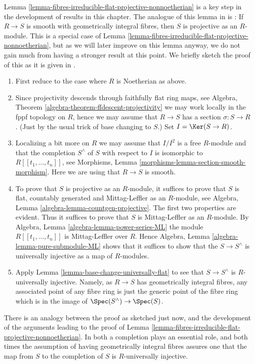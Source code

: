\begin{remark}
\label{remark-how-in-RG}
Lemma \ref{lemma-fibres-irreducible-flat-projective-nonnoetherian}
is a key step in the development of results in this chapter. The analogue
of this lemma in \cite{GruRay} is \cite[I Proposition 3.3.1]{GruRay}:
If $R \to S$ is smooth with geometrically integral fibres, then $S$
is projective as an $R$-module. This is a special case of
Lemma \ref{lemma-fibres-irreducible-flat-projective-nonnoetherian},
but as we will later improve on this lemma anyway, we do not gain much
from having a stronger result at this point.
We briefly sketch the proof of this as it is given in \cite{GruRay}.
\begin{enumerate}
\item First reduce to the case where $R$ is Noetherian as above.
\item Since projectivity descends through faithfully flat ring maps, see
Algebra, Theorem \ref{algebra-theorem-ffdescent-projectivity}
we may work locally in the fppf topology on $R$, hence we may assume
that $R \to S$ has a section $\sigma : S \to R$. (Just by the usual trick of
base changing to $S$.) Set $I = \Ker(S \to R)$.
\item Localizing a bit more on $R$ we may assume that $I/I^2$ is a free
$R$-module and that the completion $S^\wedge$ of $S$ with respect to $I$
is isomorphic to $R[[t_1, \ldots, t_n]]$, see
Morphisms, Lemma \ref{morphisms-lemma-section-smooth-morphism}.
Here we are using that $R \to S$ is smooth.
\item To prove that $S$ is projective as an $R$-module, it suffices to
prove that $S$ is flat, countably generated and Mittag-Leffler as an
$R$-module, see
Algebra, Lemma \ref{algebra-lemma-countgen-projective}.
The first two properties are evident. Thus it suffices to prove that $S$
is Mittag-Leffler as an $R$-module. By
Algebra, Lemma \ref{algebra-lemma-power-series-ML}
the module $R[[t_1, \ldots, t_n]]$ is Mittag-Leffler over $R$. Hence
Algebra, Lemma \ref{algebra-lemma-pure-submodule-ML}
shows that it suffices to show that the
$S \to S^\wedge$ is universally injective as a map of $R$-modules.
\item Apply
Lemma \ref{lemma-base-change-universally-flat}
to see that $S \to S^\wedge$ is $R$-universally injective.
Namely, as $R \to S$ has geometrically integral fibres, any associated
point of any fibre ring is just the generic point of the fibre ring which
is in the image of $\Spec(S^\wedge) \to \Spec(S)$.
\end{enumerate}
There is an analogy between the proof as sketched just now, and the
development of the arguments leading to the proof of
Lemma \ref{lemma-fibres-irreducible-flat-projective-nonnoetherian}.
In both a completion plays an essential role, and both times the
assumption of having geometrically integral fibres assures one that the
map from $S$ to the completion of $S$ is $R$-universally injective.
\end{remark}













